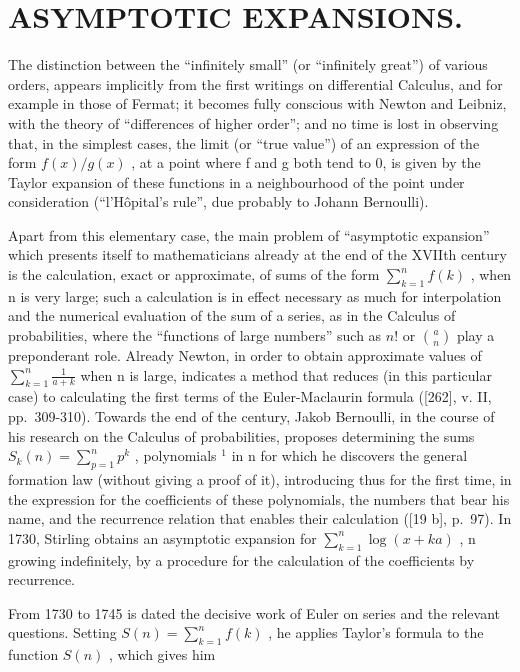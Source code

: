 \chapter{ASYMPTOTIC EXPANSIONS.}

The distinction between the ``infinitely small'' (or ``infinitely great'') of various orders, appears implicitly from the first writings on differential Calculus, and for example in those of Fermat; it becomes fully conscious with Newton and Leibniz, with the theory of ``differences of higher order''; and no time is lost in observing that, in the simplest cases, the limit (or ``true value'') of an expression of the form \(f(x)/g(x)\) , at a point where f and g both tend to 0, is given by the Taylor expansion of these functions in a neighbourhood of the point under consideration (``l'Hôpital's rule'', due probably to Johann Bernoulli).

Apart from this elementary case, the main problem of ``asymptotic expansion'' which presents itself to mathematicians already at the end of the XVIIth century is the calculation, exact or approximate, of sums of the form \(\sum_{k=1}^{n}f(k)\) , when n is very large; such a calculation is in effect necessary as much for interpolation and the numerical evaluation of the sum of a series, as in the Calculus of probabilities, where the ``functions of large numbers'' such as \(n!\) or \(\binom{a}{n}\) play a preponderant role. Already Newton, in order to obtain approximate values of \(\sum_{k=1}^{n}\frac{1}{a+k}\) when n is large, indicates a method that reduces (in this particular case) to calculating the first terms of the Euler-Maclaurin formula ({[}262{]}, v. II, pp.~309-310). Towards the end of the century, Jakob Bernoulli, in the course of his research on the Calculus of probabilities, proposes determining the sums \(S_{k}(n)=\sum_{p=1}^{n}p^{k}\) , polynomials \(^{1}\) in n for which he discovers the general formation law (without giving a proof of it), introducing thus for the first time, in the expression for the coefficients of these polynomials, the numbers that bear his name, and the recurrence relation that enables their calculation ({[}19 b{]}, p.~97). In 1730, Stirling obtains an asymptotic expansion for \(\sum_{k=1}^{n}\log(x+ka)\) , n growing indefinitely, by a procedure for the calculation of the coefficients by recurrence.

From 1730 to 1745 is dated the decisive work of Euler on series and the relevant questions. Setting \(S(n) = \sum_{k=1}^{n} f(k)\) , he applies Taylor's formula to the function \(S(n)\) , which gives him

